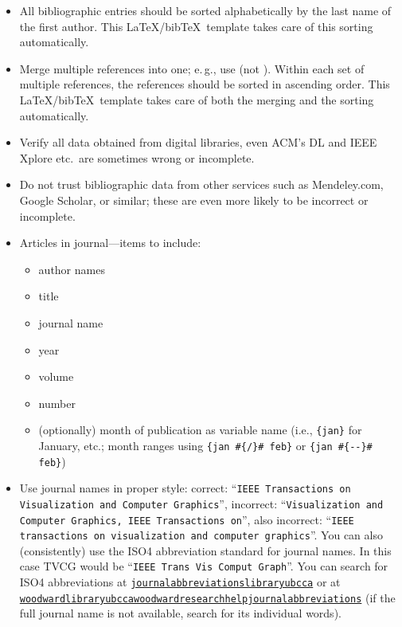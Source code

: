 \documentclass[journal]{vgtc}                     %
\begin{document}
\begin{itemize}
  \item All bibliographic entries should be sorted alphabetically by the last name of the first author.
        This \LaTeX/bib\TeX\ template takes care of this sorting automatically.
  \item Merge multiple references into one; e.\,g., use \cite{Max1995OpticalModelsDirect,Kitware2003VisualizationToolkitUsers} (not \cite{Kitware2003VisualizationToolkitUsers}\cite{Max1995OpticalModelsDirect}).
        Within each set of multiple references, the references should be sorted in ascending order.
        This \LaTeX/bib\TeX\ template takes care of both the merging and the sorting automatically.
  \item Verify all data obtained from digital libraries, even ACM's DL and IEEE Xplore  etc.\ are sometimes wrong or incomplete.
  \item Do not trust bibliographic data from other services such as Mendeley.com, Google Scholar, or similar; these are even more likely to be incorrect or incomplete.
  \item Articles in journal---items to include:
        \begin{itemize}
  	      \item author names
  	      \item title
  	      \item journal name
  	      \item year
  	      \item volume
  	      \item number
  	      \item (optionally) month of publication as variable name (i.e., \texttt{\{jan\}} for January, etc.; month ranges using \texttt{\{jan \#\{/\}\# feb\}} or \texttt{\{jan \#\{-{}-\}\# feb\}})
        \end{itemize}
  \item Use journal names in proper style: correct: ``\texttt{IEEE Transactions on Visualization and Computer Graphics}'', incorrect: ``\texttt{Visualization and Computer Graphics, IEEE Transactions on}'', also incorrect: ``\texttt{IEEE transactions on visualization and computer graphics}''.  You can also (consistently) use the ISO4 abbreviation standard for journal names. In this case TVCG would be ``\texttt{IEEE Trans Vis Comput Graph}''. You can search for ISO4 abbreviations at \href{https://journal-abbreviations.library.ubc.ca/}{\texttt{journal\discretionary{}{-}{-}abbreviationslibraryubcca}} or at \href{https://woodward.library.ubc.ca/woodward/research-help/journal-abbreviations/}{\texttt{woodwardlibraryubcca\discretionary{/}{}{/}woodward\discretionary{/}{}{/}research\discretionary{}{-}{-}help\discretionary{/}{}{/}journal\discretionary{}{-}{-}abbreviations}} (if the full journal name is not available, search for its individual words).

\end{itemize}
\end{document}
